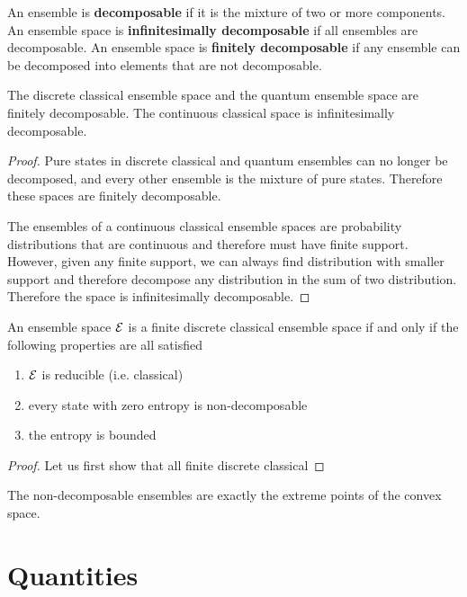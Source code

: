 \begin{defn}
	An ensemble is \textbf{decomposable} if it is the mixture of two or more components. An ensemble space is \textbf{infinitesimally decomposable} if all ensembles are decomposable. An ensemble space is \textbf{finitely decomposable} if any ensemble can be decomposed into elements that are not decomposable.
\end{defn}

\begin{prop}
	The discrete classical ensemble space and the quantum ensemble space are finitely decomposable. The continuous classical space is infinitesimally decomposable.
\end{prop}

\begin{proof}
	Pure states in discrete classical and quantum ensembles can no longer be decomposed, and every other ensemble is the mixture of pure states. Therefore these spaces are finitely decomposable.
	
	The ensembles of a continuous classical ensemble spaces are probability distributions that are continuous and therefore must have finite support. However, given any finite support, we can always find distribution with smaller support and therefore decompose any distribution in the sum of two distribution. Therefore the space is infinitesimally decomposable.
\end{proof}

\begin{conj}
	An ensemble space $\mathcal{E}$ is a finite discrete classical ensemble space if and only if the following properties are all satisfied
	\begin{enumerate}
		\item $\mathcal{E}$ is reducible (i.e. classical)
		\item every state with zero entropy is non-decomposable
		\item the entropy is bounded
	\end{enumerate}
\end{conj}

\begin{proof}
	Let us first show that all finite discrete classical 
\end{proof}

\begin{remark}
	The non-decomposable ensembles are exactly the extreme points of the convex space.
\end{remark}

\section{Quantities}

